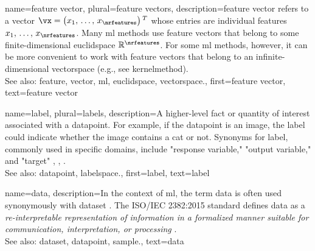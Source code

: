 {name={feature vector}, plural={feature vectors},
	description={\Gls{feature} \gls{vector} refers to a \gls{vector} $\vx = \big(x_{1}, \,\ldots, \,x_{\nrfeatures}\big)\,^{T}$ 
		whose entries are individual \glspl{feature} $x_{1}, \,\ldots, \,x_{\nrfeatures}$. Many \gls{ml} methods 
		use \gls{feature} \glspl{vector} that belong to some finite-dimensional \gls{euclidspace} $\mathbb{R}^{\nrfeatures}$. 
		For some \gls{ml} methods, however, it can be more convenient to work with \gls{feature} 
		\glspl{vector} that belong to an infinite-dimensional \gls{vectorspace} (e.g., see \gls{kernelmethod}). 
			\\
		See also: \gls{feature}, \gls{vector}, \gls{ml}, \gls{euclidspace}, \gls{vectorspace}.}, 
	first={feature vector},
	text={feature vector}  
}


{name={label}, plural={labels},
	description={A higher-level fact or quantity of interest associated 
	with a \gls{datapoint}. For example, if the \gls{datapoint} is an image, the label 
	could indicate whether the image contains a cat or not. Synonyms for label, commonly 
	used in specific domains, include "response variable," "output variable," and "target" \cite{Gujarati2021}, \cite{Dodge2003}, \cite{Everitt2010}.
				\\
		See also: \gls{datapoint}, \gls{labelspace}.},
	first={label},
	text={label}  
}


{name={data},
 description={In the context of \gls{ml}, the term 
 data is often used synonymously with \gls{dataset}
  \cite{Everitt2010,OxfordStatisticsDictionary}. 
  The ISO/IEC 2382:2015 standard defines data as a \emph{re-interpretable representation of 
  information in a formalized manner suitable for communication, interpretation, 
  or processing} \cite{ISO2382}. 
  \\
  See also: \gls{dataset}, \gls{datapoint}, \gls{sample}.}, 
  text={data}
}
		
